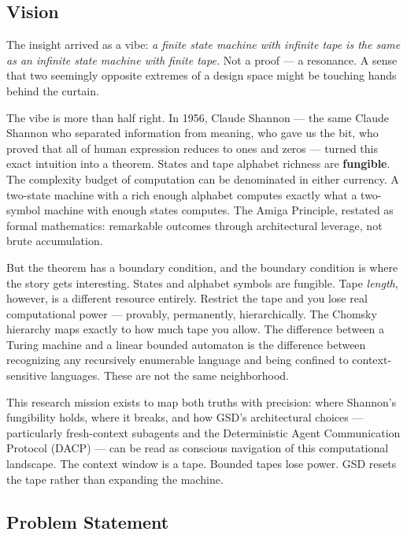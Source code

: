 \documentclass[11pt,letterpaper]{article}
\begin{document}
\subsection{Vision}

The insight arrived as a vibe: \textit{a finite state machine with infinite tape is the same as an infinite state machine with finite tape.} Not a proof --- a resonance. A sense that two seemingly opposite extremes of a design space might be touching hands behind the curtain.

The vibe is more than half right. In 1956, Claude Shannon --- the same Claude Shannon who separated information from meaning, who gave us the bit, who proved that all of human expression reduces to ones and zeros --- turned this exact intuition into a theorem. States and tape alphabet richness are \textbf{fungible}. The complexity budget of computation can be denominated in either currency. A two-state machine with a rich enough alphabet computes exactly what a two-symbol machine with enough states computes. The Amiga Principle, restated as formal mathematics: remarkable outcomes through architectural leverage, not brute accumulation.

But the theorem has a boundary condition, and the boundary condition is where the story gets interesting. States and alphabet symbols are fungible. Tape \textit{length}, however, is a different resource entirely. Restrict the tape and you lose real computational power --- provably, permanently, hierarchically. The Chomsky hierarchy maps exactly to how much tape you allow. The difference between a Turing machine and a linear bounded automaton is the difference between recognizing any recursively enumerable language and being confined to context-sensitive languages. These are not the same neighborhood.

This research mission exists to map both truths with precision: where Shannon's fungibility holds, where it breaks, and how GSD's architectural choices --- particularly fresh-context subagents and the Deterministic Agent Communication Protocol (DACP) --- can be read as conscious navigation of this computational landscape. The context window is a tape. Bounded tapes lose power. GSD resets the tape rather than expanding the machine.

\subsection{Problem Statement}
\end{document}
